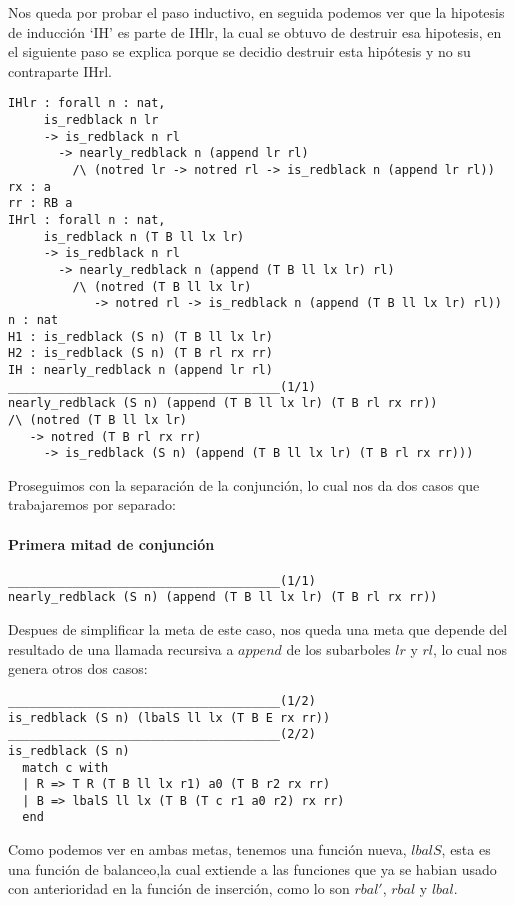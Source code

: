 Nos queda por probar el paso inductivo, en seguida podemos ver que la hipotesis de inducci\'on
`IH' es parte de IHlr, la cual se obtuvo de destruir esa hipotesis, en el siguiente paso se explica porque se decidio destruir esta hip\'otesis y no su contraparte IHrl.

\begin{verbatim}
IHlr : forall n : nat,
     is_redblack n lr
     -> is_redblack n rl
       -> nearly_redblack n (append lr rl)
         /\ (notred lr -> notred rl -> is_redblack n (append lr rl))
rx : a
rr : RB a
IHrl : forall n : nat,
     is_redblack n (T B ll lx lr)
     -> is_redblack n rl
       -> nearly_redblack n (append (T B ll lx lr) rl)
         /\ (notred (T B ll lx lr)
            -> notred rl -> is_redblack n (append (T B ll lx lr) rl))
n : nat
H1 : is_redblack (S n) (T B ll lx lr)
H2 : is_redblack (S n) (T B rl rx rr)
IH : nearly_redblack n (append lr rl)
______________________________________(1/1)
nearly_redblack (S n) (append (T B ll lx lr) (T B rl rx rr))
/\ (notred (T B ll lx lr)
   -> notred (T B rl rx rr)
     -> is_redblack (S n) (append (T B ll lx lr) (T B rl rx rr)))
\end{verbatim}

Proseguimos con la separaci\'on de la conjunci\'on, lo cual nos da dos casos que trabajaremos por
separado:

\paragraph{Primera mitad de conjunci\'on}

\begin{verbatim}
______________________________________(1/1)
nearly_redblack (S n) (append (T B ll lx lr) (T B rl rx rr))
\end{verbatim}

Despues de simplificar la meta de este caso, nos queda una meta que depende del resultado de una
llamada recursiva a $append$ de los subarboles $lr$ y $rl$, lo cual nos genera otros dos casos:

\begin{verbatim}
______________________________________(1/2)
is_redblack (S n) (lbalS ll lx (T B E rx rr))
______________________________________(2/2)
is_redblack (S n)
  match c with
  | R => T R (T B ll lx r1) a0 (T B r2 rx rr)
  | B => lbalS ll lx (T B (T c r1 a0 r2) rx rr)
  end
\end{verbatim}

Como podemos ver en ambas metas, tenemos una funci\'on nueva, $lbalS$, esta es una funci\'on de
balanceo,la cual extiende a las funciones que ya se habian usado con anterioridad en la funci\'on
de inserci\'on, como lo son $rbal'$, $rbal$ y $lbal$.

